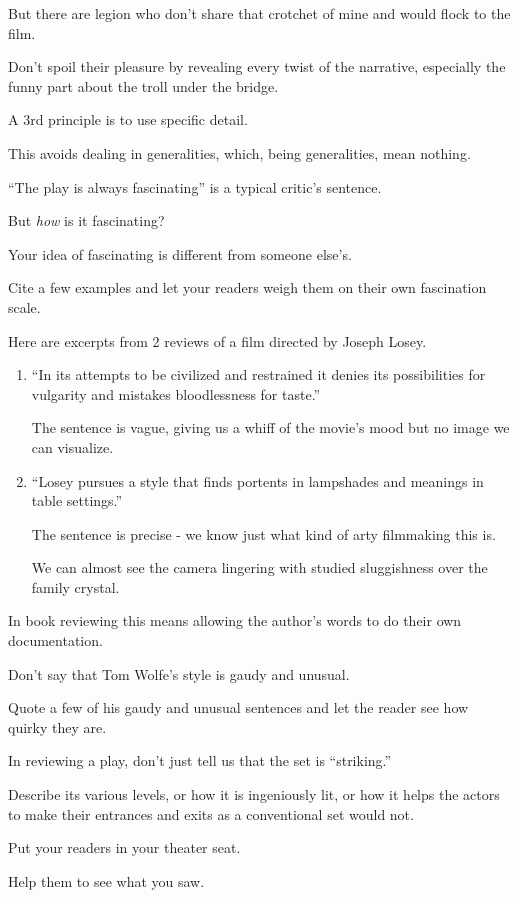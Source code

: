\documentclass{book}
\numberwithin{equation}{section}
\begin{document}
But there are legion who don't share that crotchet of mine and would flock to the film.

Don't spoil their pleasure by revealing every twist of the narrative, especially the funny part about the troll under the bridge.

%
A 3rd principle is to use specific detail.

This avoids dealing in generalities, which, being generalities, mean nothing.

``The play is always fascinating'' is a typical critic's sentence.

But \textit{how} is it fascinating?

Your idea of fascinating is different from someone else's.

Cite a few examples and let your readers weigh them on their own fascination scale.

Here are excerpts from 2 reviews of a film directed by Joseph Losey.
\begin{enumerate}
    \item ``In its attempts to be civilized and restrained it denies its possibilities for vulgarity and mistakes bloodlessness for taste.''
    
    The sentence is vague, giving us a whiff of the movie's mood but no image we can visualize.
    \item ``Losey pursues a style that finds portents in lampshades and meanings in table settings.''
    
    The sentence is precise - we know just what kind of arty filmmaking this is.
    
    We can almost see the camera lingering with studied sluggishness over the family crystal.
\end{enumerate}
%
In book reviewing this means allowing the author's words to do their own documentation.

Don't say that Tom Wolfe's style is gaudy and unusual.

Quote a few of his gaudy and unusual sentences and let the reader see how quirky they are.

In reviewing a play, don't just tell us that the set is ``striking.''

Describe its various levels, or how it is ingeniously lit, or how it helps the actors to make their entrances and exits as a conventional set would not.

Put your readers in your theater seat.

Help them to see what you saw.
\end{document}
